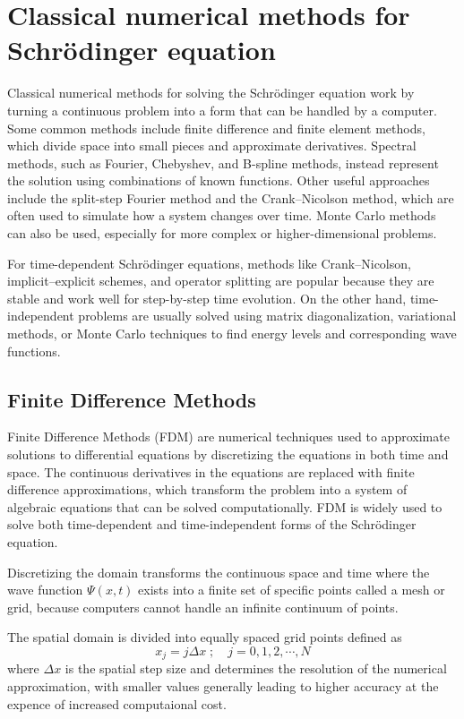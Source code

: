 \documentclass[11pt]{article}
\begin{document}
\section{Classical numerical methods for Schrödinger equation}
Classical numerical methods for solving the Schrödinger equation work by turning a continuous problem into a form that can be handled by a computer. Some common methods include finite difference and finite element methods, which divide space into small pieces and approximate derivatives. Spectral methods, such as Fourier, Chebyshev, and B-spline methods, instead represent the solution using combinations of known functions. Other useful approaches include the split-step Fourier method and the Crank–Nicolson method, which are often used to simulate how a system changes over time. Monte Carlo methods can also be used, especially for more complex or higher-dimensional problems.

For time-dependent Schrödinger equations, methods like Crank–Nicolson, implicit–explicit schemes, and operator splitting are popular because they are stable and work well for step-by-step time evolution. On the other hand, time-independent problems are usually solved using matrix diagonalization, variational methods, or Monte Carlo techniques to find energy levels and corresponding wave functions.

\subsection{Finite Difference Methods}
Finite Difference Methods (FDM) are numerical techniques used to approximate solutions to differential equations by discretizing the equations in both time and space. The continuous derivatives in the equations are replaced with finite difference approximations, which transform the problem into a system of algebraic equations that can be solved computationally. FDM is widely used to solve both time-dependent and time-independent forms of the Schrödinger equation.

Discretizing the domain transforms the continuous space and time where the wave function $\Psi (x,t)$ exists into a finite set of specific points called a mesh or grid, because computers cannot handle an infinite continuum of points.

The spatial domain is divided into equally spaced grid points defined as 
\begin{equation}
	x_j = j \Delta x \; ; \quad j = 0, 1, 2, \cdots , N
\end{equation}
where $\Delta x$ is the spatial step size and determines the resolution of the numerical approximation, with smaller values generally leading to higher accuracy at the expence of increased computaional cost.
\end{document}
